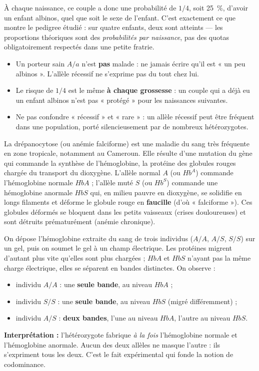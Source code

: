 \documentclass[11pt]{article}
\newcommand{\cle}[1]{{\popxbold\color{popdark}#1}}
\newcounter{popsec}
\newcounter{popsub}
\newcommand{\courssub}[1]{%
  \stepcounter{popsub}%
  \par\vspace{9pt}\noindent{\popxbold\fontsize{11.5}{13}\selectfont\color{popink}{\color{poporange}\thepopsec.\thepopsub}\hspace{6pt}#1}\par\nopagebreak\vspace{4pt}
}
\begin{document}
À chaque naissance, ce couple a donc une probabilité de $1/4$, soit \SI{25}{\%}, d'avoir un enfant albinos, quel que soit le sexe de l'enfant. C'est exactement ce que montre le pedigree étudié : sur quatre enfants, deux sont atteints — les proportions théoriques sont des \emph{probabilités par naissance}, pas des quotas obligatoirement respectés dans une petite fratrie.

\begin{attention}
\begin{itemize}
\item Un porteur sain $A/a$ n'est \textbf{pas} malade : ne jamais écrire qu'il est « un peu albinos ». L'allèle récessif ne s'exprime pas du tout chez lui.
\item Le risque de $1/4$ est le même \textbf{à chaque grossesse} : un couple qui a déjà eu un enfant albinos n'est pas « protégé » pour les naissances suivantes.
\item Ne pas confondre « récessif » et « rare » : un allèle récessif peut être fréquent dans une population, porté silencieusement par de nombreux hétérozygotes.
\end{itemize}
\end{attention}

\courssub{La drépanocytose : une hémoglobine anormale}

La \cle{drépanocytose} (ou anémie falciforme) est une maladie du sang très fréquente en zone tropicale, notamment au Cameroun. Elle résulte d'une mutation du gène qui commande la synthèse de l'hémoglobine, la protéine des globules rouges chargée du transport du dioxygène. L'allèle normal $A$ (ou $Hb^A$) commande l'hémoglobine normale $HbA$ ; l'allèle muté $S$ (ou $Hb^S$) commande une hémoglobine anormale $HbS$ qui, en milieu pauvre en dioxygène, se solidifie en longs filaments et déforme le globule rouge en \textbf{faucille} (d'où « falciforme »). Ces globules déformés se bloquent dans les petits vaisseaux (crises douloureuses) et sont détruits prématurément (anémie chronique).

\begin{experience}
On dépose l'hémoglobine extraite du sang de trois individus ($A/A$, $A/S$, $S/S$) sur un gel, puis on soumet le gel à un champ électrique. Les protéines migrent d'autant plus vite qu'elles sont plus chargées ; $HbA$ et $HbS$ n'ayant pas la même charge électrique, elles se séparent en bandes distinctes. On observe :
\begin{itemize}
\item individu $A/A$ : une \textbf{seule bande}, au niveau $HbA$ ;
\item individu $S/S$ : une \textbf{seule bande}, au niveau $HbS$ (migré différemment) ;
\item individu $A/S$ : \textbf{deux bandes}, l'une au niveau $HbA$, l'autre au niveau $HbS$.
\end{itemize}
\textbf{Interprétation :} l'hétérozygote fabrique \emph{à la fois} l'hémoglobine normale et l'hémoglobine anormale. Aucun des deux allèles ne masque l'autre : ils s'expriment tous les deux. C'est le fait expérimental qui fonde la notion de \cle{codominance}.
\end{experience}
\end{document}
